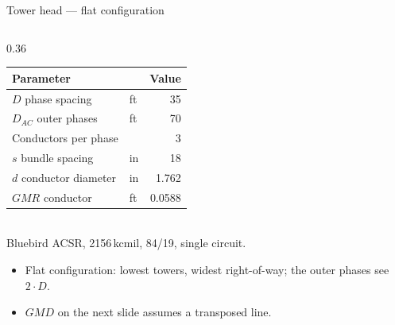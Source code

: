 \begin{frame}{Tower head --- flat configuration}
\begin{columns}[c,onlytextwidth]
\begin{column}{0.36\textwidth}
{\begin{tabular}{@{}l l r@{}}
        \textbf{Parameter} & & \multicolumn{1}{c}{\textbf{Value}} \\
        \hline
        $D$ phase spacing & ft & 35 \\
        $D_{AC}$ outer phases & ft & 70 \\
        Conductors per phase & & 3 \\
        $s$ bundle spacing & in & 18 \\
        $d$ conductor diameter & in & 1.762 \\
        $GMR$ conductor & ft & 0.0588 \\
        \hline
      \end{tabular}}\\[0.3em]
      {\color{atGray}\footnotesize Bluebird ACSR, 2156\,kcmil, 84/19,
      single circuit.}\\[0.6em]
      {\small
      \begin{itemize}
        \setlength{\itemsep}{0.3em}
        \item Flat configuration: lowest towers, widest right-of-way; the
              outer phases see $2\cdot D$.
        \item $GMD$ on the next slide assumes a transposed line.
      \end{itemize}}
    \end{column}
  \end{columns}
\end{frame}

